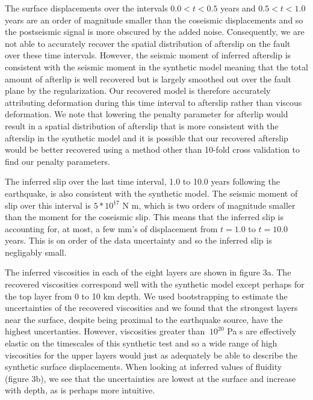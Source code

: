 \documentclass[extra]{gji}
\begin{document}
The surface displacements over the intervals $0.0<t<0.5$ years and
$0.5<t<1.0$ years are an order of magnitude smaller than the coseismic
displacements and so the postseismic signal is more obscured by the added
noise.  Consequently, we are not able to accurately recover the
spatial distribution of afterslip on the fault over these time
intervals.  However, the seismic moment of inferred afterslip is
consistent with the seismic moment in the synthetic model meaning that
the total amount of afterlip is well recovered but is largely smoothed
out over the fault plane by the regularization.  Our recovered model
is therefore accurately attributing deformation during this time
interval to afterslip rather than viscous deformation. We note that
lowering the penalty parameter for afterlip would result in a spatial
distribution of afterslip that is more consistent with the afterslip
in the synthetic model and it is possible that our recovered afterslip
would be better recovered using a method other than 10-fold cross
validation to find our penalty parameters.

The inferred slip over the last time interval, 1.0 to 10.0 years
following the earthquake, is also consistent with the synthetic model.
The seismic moment of slip over this interval is $5*10^{17}$ N m,
which is two orders of magnitude smaller than the moment for the
coseismic slip.  This means that the inferred slip is accounting for,
at most, a few mm's of displacement from $t=1.0$ to $t=10.0$ years.
This is on order of the data uncertainty and so the inferred slip is
negligably small.

The inferred viscosities in each of the eight layers are shown in
figure 3a.  The recovered viscosities correspond well with the
synthetic model except perhaps for the top layer from 0 to 10 km
depth.  We used bootstrapping to estimate the uncertainties of the
recovered viscosities and we found that the strongest layers near the
surface, despite being proximal to the earthquake source, have the
highest uncertanties.  However, viscosities greater than $~10^{20}$ Pa s are
effectively elastic on the timescales of this synthetic test and so a
wide range of high viscosities for the upper layers would just as
adequately be able to describe the synthetic surface displacements.
When looking at inferred values of fluidity (figure 3b), we see that
the uncertainties are lowest at the surface and increase with depth,
as is perhaps more intuitive.

\end{document}
